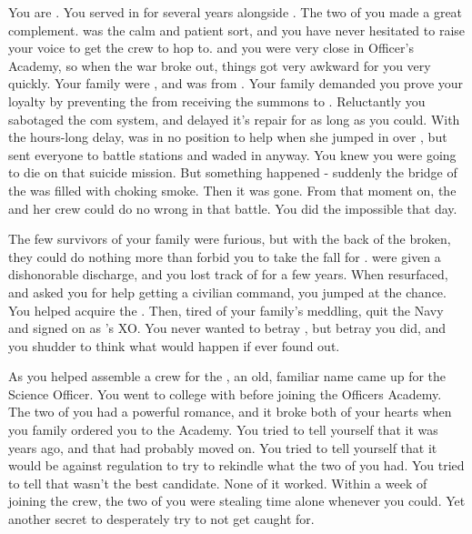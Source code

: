 \documentclass[char]{TMFHope}
\begin{document}
\name{\cXO{}}

You are \cXO{}. You served in \TMN{} for several years alongside \cCap{}. The two of you made a great complement. \cCap{} was the calm and patient sort, and you have never hesitated to raise your voice to get the crew to hop to. \cCap{} and you were very close in Officer's Academy, so when the war broke out, things got very awkward for you very quickly. Your family were \pEdge{}, and \cCap{} was from \pHome{}. Your family demanded you prove your loyalty by preventing the \pOld{} from receiving the summons to \pBattle{}. Reluctantly you sabotaged the \pOld{} com system, and delayed it's repair for as long as you could. With the hours-long delay, \pOld{} was in no position to help when she jumped in over \pHome{}, but \cCap{} sent everyone to battle stations and waded in anyway. You knew you were going to die on that suicide mission. But something happened - suddenly the bridge of the \pOld{} was filled with choking smoke. Then it was gone. From that moment on, the \pOld{} and her crew could do no wrong in that battle. You did the impossible that day.

The few survivors of your family were furious, but with the back of the \pEdge{} broken, they could do nothing more than forbid you to take the fall for \cCap{}. \cCap{\They} were given a dishonorable discharge, and you lost track of \cCap{\them} for a few years. When \cCap{\they} resurfaced, and asked you for help getting a civilian command, you jumped at the chance. You helped \cCap{} acquire the \pNew{}. Then, tired of your family's meddling, quit the Navy and signed on as \cCap{}'s XO. You never wanted to betray \cCap{\them}, but betray you did, and you shudder to think what would happen if \cCap{} ever found out.

As you helped \cCap{} assemble a crew for the \pNew{}, an old, familiar name came up for the Science Officer. You went to college with \cSci{} before joining the Officers Academy. The two of you had a powerful romance, and it broke both of your hearts when you family ordered you to the Academy. You tried to tell yourself that it was years ago, and that \cSci{} had probably moved on. You tried to tell yourself that it would be against regulation to try to rekindle what the two of you had. You tried to tell \cCap{} that \cSci{} wasn't the best candidate. None of it worked. Within a week of \cSci{} joining the crew, the two of you were stealing time alone whenever you could. Yet another secret to desperately try to not get caught for.
\end{document}
